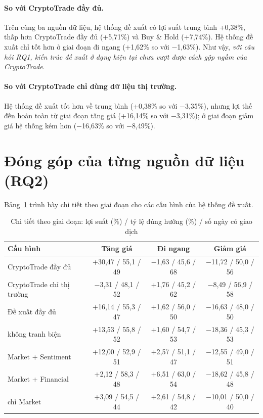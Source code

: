 \paragraph{So với CryptoTrade đầy đủ.} Trên cùng ba nguồn dữ liệu, hệ thống đề xuất có lợi suất trung bình +0,38\%,
thấp hơn CryptoTrade đầy đủ (+5,71\%) và Buy \& Hold (+7,74\%). Hệ thống đề xuất chỉ tốt hơn ở giai đoạn đi ngang
(+1,62\% so với $-$1,63\%). Như vậy, \emph{với câu hỏi RQ1, kiến trúc đề xuất ở dạng hiện tại chưa vượt được cách gộp
ngầm của CryptoTrade}.

\paragraph{So với CryptoTrade chỉ dùng dữ liệu thị trường.} Hệ thống đề xuất tốt hơn về trung bình (+0,38\% so với
$-$3,35\%), nhưng lợi thế đến hoàn toàn từ giai đoạn tăng giá (+16,14\% so với $-$3,31\%); ở giai đoạn giảm giá hệ thống
kém hơn ($-$16,63\% so với $-$8,49\%).

\section{Đóng góp của từng nguồn dữ liệu (RQ2)}
Bảng~\ref{tab:per-window} trình bày chi tiết theo giai đoạn cho các cấu hình của hệ thống đề xuất.

\begin{table}[H]
\centering
\caption{Chi tiết theo giai đoạn: lợi suất (\%) / tỷ lệ đúng hướng (\%) / số ngày có giao dịch}
\label{tab:per-window}
\small
\begin{tabular}{lccc}
\toprule
Cấu hình & Tăng giá & Đi ngang & Giảm giá \\
\midrule
CryptoTrade đầy đủ & +30,47 / 55,1 / 49 & $-$1,63 / 45,6 / 68 & $-$11,72 / 50,0 / 56 \\
CryptoTrade chỉ thị trường & $-$3,31 / 48,1 / 52 & +1,76 / 45,2 / 62 & $-$8,49 / 56,9 / 58 \\
\midrule
Đề xuất đầy đủ & +16,14 / 55,3 / 47 & +1,62 / 56,0 / 50 & $-$16,63 / 48,0 / 50 \\
\quad không tranh biện & +13,53 / 55,8 / 52 & +1,60 / 54,7 / 53 & $-$18,36 / 45,3 / 53 \\
\quad Market + Sentiment & +12,00 / 52,9 / 51 & +2,57 / 51,1 / 47 & $-$12,55 / 49,0 / 51 \\
\quad Market + Financial & +2,12 / 58,3 / 48 & +6,51 / 63,0 / 54 & $-$18,62 / 45,8 / 48 \\
\quad chỉ Market & +3,09 / 54,5 / 44 & +2,61 / 54,8 / 42 & $-$10,01 / 50,0 / 40 \\
\bottomrule
\end{tabular}
\end{table}


